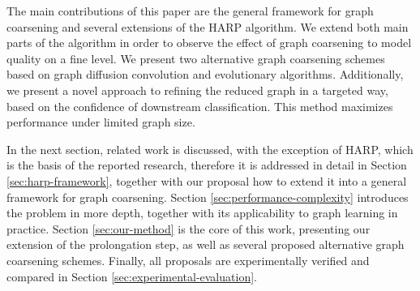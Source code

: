 The main contributions of this paper are the general framework for graph coarsening and several extensions of the HARP algorithm. We extend both main parts of the algorithm in order to observe the effect of graph coarsening to model quality on a fine level. We present two alternative graph coarsening schemes based on graph diffusion convolution and evolutionary algorithms. Additionally, we present a novel approach to refining the reduced graph in a targeted way, based on the confidence of downstream classification. This method maximizes performance under limited graph size.

In the next section, related work is discussed, with the exception of HARP, which is the basis of the reported research, therefore it is addressed in detail in Section \ref{sec:harp-framework}, together with our proposal how to extend it into a general framework for graph coarsening. Section \ref{sec:performance-complexity} introduces the problem in more depth, together with its applicability to graph learning in practice. Section \ref{sec:our-method} is the core of this work, presenting our extension of the prolongation step, as well as several proposed alternative graph coarsening schemes. Finally, all proposals are experimentally verified and compared in Section \ref{sec:experimental-evaluation}.
